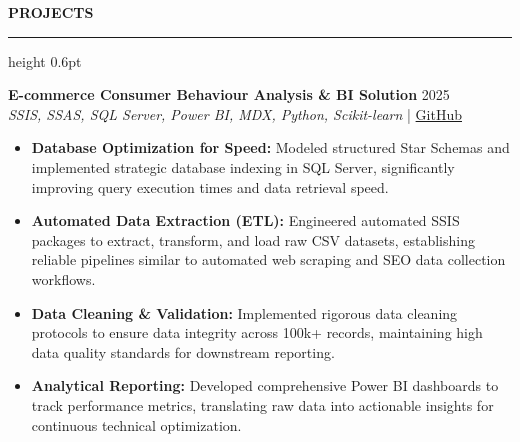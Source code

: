 ﻿\documentclass{resume}
\renewcommand{\sectionskip}{\vspace{5pt}}
\renewcommand{\sectionlineskip}{\vspace{3pt}}
\renewenvironment{rSection}[1]{
  \sectionskip
  {\color{headerblue}\textbf{\MakeUppercase{#1}}}
  \sectionlineskip
  {\color{rulegray}\hrule height 0.6pt}
  \vspace{0pt}
  \begin{list}{}{
    \setlength{\leftmargin}{0em}
    \setlength{\topsep}{0pt}
    \setlength{\partopsep}{0pt}
    \setlength{\parsep}{0pt}
    \setlength{\itemsep}{0pt}
  }
  \item[]
}{
  \end{list}
}
\begin{document}
\begin{rSection}{Projects}
    \item \textbf{E-commerce Consumer Behaviour Analysis \& BI Solution} \hfill 2025\\
    {\small \textit{SSIS, SSAS, SQL Server, Power BI, MDX, Python, Scikit-learn}} \hfill | \href{https://github.com/vietpham10205/Datawarehouse-Olap_Project-E-commerce-Consumer-Behavior-Analysis-BI-Solution}{GitHub}
    {\small
    \begin{itemize}[itemsep=4pt, parsep=0pt, leftmargin=1.2em]
        \item \textbf{Database Optimization for Speed:} Modeled structured Star Schemas and implemented strategic database indexing in SQL Server, significantly improving query execution times and data retrieval speed.
        \item \textbf{Automated Data Extraction (ETL):} Engineered automated SSIS packages to extract, transform, and load raw CSV datasets, establishing reliable pipelines similar to automated web scraping and SEO data collection workflows.
        \item \textbf{Data Cleaning \& Validation:} Implemented rigorous data cleaning protocols to ensure data integrity across 100k+ records, maintaining high data quality standards for downstream reporting.
        \item \textbf{Analytical Reporting:} Developed comprehensive Power BI dashboards to track performance metrics, translating raw data into actionable insights for continuous technical optimization.
    \end{itemize}
    }
\end{rSection}
\end{document}
